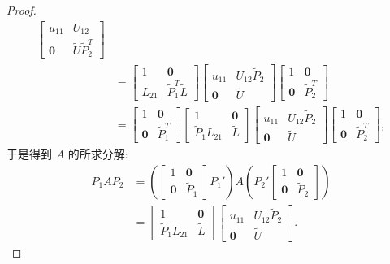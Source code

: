 \begin{proof}
\[\begin{aligned}
\begin{bmatrix}
      u_{11} & U_{12}\\
      \mathbf{0} & \widetilde{U}\widetilde{P}_2^T
    \end{bmatrix}\\
    &=
    \begin{bmatrix}
      1      & \mathbf{0}\\
      L_{21} & \widetilde{P}_1^T\widetilde{L}
    \end{bmatrix}
    \begin{bmatrix}
      u_{11} & U_{12}\widetilde{P}_2\\
      \mathbf{0} & \widetilde{U}
    \end{bmatrix}
    \begin{bmatrix}
      1      & \mathbf{0}\\
      \mathbf{0} & \widetilde{P}_2^T
    \end{bmatrix}\\
    &=
    \begin{bmatrix}
      1      & \mathbf{0}\\
      \mathbf{0} & \widetilde{P}_1^T
    \end{bmatrix}
    \begin{bmatrix}
      1      & \mathbf{0}\\
      \widetilde{P}_1L_{21} & \widetilde{L}
    \end{bmatrix}
    \begin{bmatrix}
      u_{11} & U_{12}\widetilde{P}_2\\
      \mathbf{0} & \widetilde{U}
    \end{bmatrix}
    \begin{bmatrix}
      1      & \mathbf{0}\\
      \mathbf{0} & \widetilde{P}_2^T
    \end{bmatrix},
  \end{aligned}
\]
于是得到 $A$ 的所求分解:
\[
  \begin{aligned}
    P_1AP_2
    &=\left(
      \begin{bmatrix}
        1 & \mathbf{0}\\
        \mathbf{0} & \widetilde{P}_1
      \end{bmatrix}P_1'
    \right)
    A
    \left(
      P_2'
      \begin{bmatrix}
        1 & \mathbf{0}\\
        \mathbf{0} & \widetilde{P}_2
      \end{bmatrix}
    \right)\\
    &=
    \begin{bmatrix}
      1      & \mathbf{0}\\
      \widetilde{P}_1L_{21} & \widetilde{L}
    \end{bmatrix}
    \begin{bmatrix}
      u_{11} & U_{12}\widetilde{P}_2\\
      \mathbf{0} & \widetilde{U}
    \end{bmatrix}.
  \end{aligned}
\]
\end{proof}

